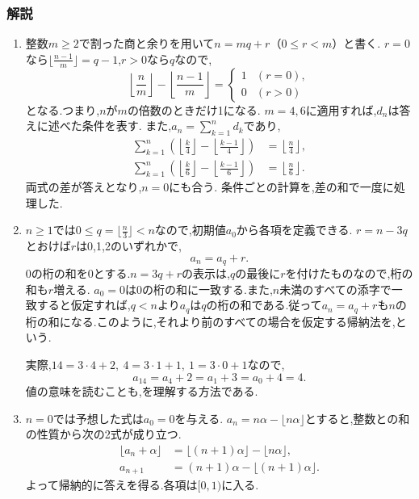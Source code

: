 \subsubsection{解説}\label{節：ガウス記号の関連問題：解説}
\begin{enumerate}[label=\textbf{問\arabic*.},leftmargin=3.8em,format=\bookitemlink{practice-gauss}{solution}{problem}]
  \item 整数$m\ge2$で割った商と余りを用いて$n=mq+r$（$0\le r<m$）と書く.
    $r=0$なら$\lfloor\frac{n-1}{m}\rfloor=q-1$,$r>0$なら$q$なので,
    \[
      \left\lfloor\frac nm\right\rfloor
      -\left\lfloor\frac{n-1}{m}\right\rfloor
      =\begin{cases}
        1&(r=0),\\
        0&(r>0)
      \end{cases}
    \]
    となる.つまり,$n$が$m$の倍数のときだけ1になる.
    $m=4,6$に適用すれば,$d_n$は答えに述べた条件を表す.
    また,$a_n=\sum_{k=1}^{n}d_k$であり,
    \begin{align*}
      \sum_{k=1}^{n}\left(
      \left\lfloor\frac k4\right\rfloor-
      \left\lfloor\frac{k-1}{4}\right\rfloor\right)
      &=\left\lfloor\frac n4\right\rfloor,\\
      \sum_{k=1}^{n}\left(
      \left\lfloor\frac k6\right\rfloor-
      \left\lfloor\frac{k-1}{6}\right\rfloor\right)
      &=\left\lfloor\frac n6\right\rfloor.
    \end{align*}
    両式の差が答えとなり,$n=0$にも合う.
    条件ごとの計算を,差の和で一度に処理した.
  \item $n\ge1$では$0\le q=\lfloor\frac n3\rfloor<n$なので,初期値$a_0$から各項を定義できる.
    $r=n-3q$とおけば$r$は0,1,2のいずれかで,
    \[
      a_n=a_q+r.
    \]
    0の桁の和を0とする.$n=3q+r$の表示は,$q$の最後に$r$を付けたものなので,桁の和も$r$増える.
    $a_0=0$は0の桁の和に一致する.また,$n$未満のすべての添字で一致すると仮定すれば,$q<n$より$a_q$は$q$の桁の和である.従って$a_n=a_q+r$も$n$の桁の和になる.このように,それより前のすべての場合を仮定する帰納法を,\textbf{}という.

    実際,$14=3\cdot4+2,\ 4=3\cdot1+1,\ 1=3\cdot0+1$なので,
    \[
      a_{14}=a_4+2=a_1+3=a_0+4=4.
    \]
    値の意味を読むことも,を理解する方法である.
  \item $n=0$では予想した式は$a_0=0$を与える.
    $a_n=n\alpha-\lfloor n\alpha\rfloor$とすると,整数との和の性質から次の2式が成り立つ.
    \begin{align*}
      \lfloor a_n+\alpha\rfloor
      &=\lfloor(n+1)\alpha\rfloor-\lfloor n\alpha\rfloor,\\
      a_{n+1}
      &=(n+1)\alpha-\lfloor(n+1)\alpha\rfloor.
    \end{align*}
    よって帰納的に答えを得る.各項は$[0,1)$に入る.


\end{enumerate}
